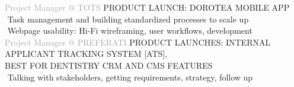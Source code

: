 \begin{cvtable}
{\textcolor{darkgray}{Project Manager \newline @ TOTS}}%
{
}%
{%
    {\scriptsize PRODUCT LAUNCH: DOROTEA MOBILE APP} \\
     \textperiodcentered $ $ Task management and building standardized processes to scale up \\
    \textperiodcentered $ $ Webpage usability: Hi-Fi wireframing, user workflows, development \\
}
% 
% 
{\textcolor{darkgray}{%
Project Manager
\newline
@
{P\scriptsize REFERATI}
}}%
{
}%
{%
    {\scriptsize PRODUCT LAUNCHES:
    INTERNAL APPLICANT TRACKING SYSTEM [ATS], \\
    BEST FOR DENTISTRY CRM AND CMS FEATURES
    } \\
     \textperiodcentered $ $ Talking with stakeholders, %
     getting requirements, strategy, follow up \\  %
}
\end{cvtable}
